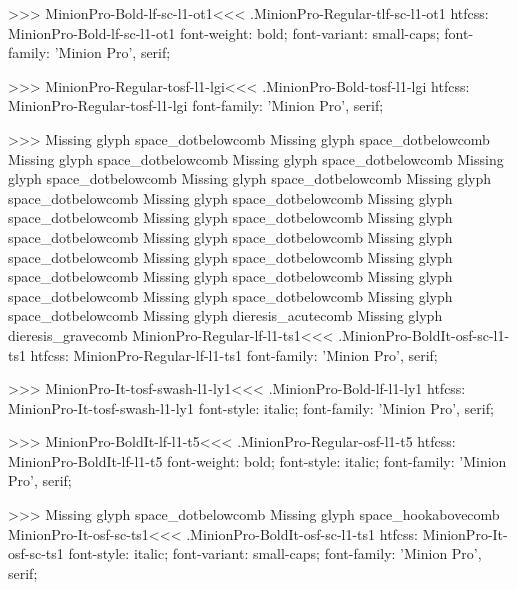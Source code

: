{{>>>
\<MinionPro-Bold-lf-sc-l1-ot1\><<<
.MinionPro-Regular-tlf-sc-l1-ot1
htfcss:  MinionPro-Bold-lf-sc-l1-ot1  font-weight: bold; font-variant: small-caps; font-family: 'Minion Pro', serif;

>>>
\<MinionPro-Regular-tosf-l1-lgi\><<<
.MinionPro-Bold-tosf-l1-lgi
htfcss:  MinionPro-Regular-tosf-l1-lgi  font-family: 'Minion Pro', serif;

>>>
Missing glyph	space_dotbelowcomb
Missing glyph	space_dotbelowcomb
Missing glyph	space_dotbelowcomb
Missing glyph	space_dotbelowcomb
Missing glyph	space_dotbelowcomb
Missing glyph	space_dotbelowcomb
Missing glyph	space_dotbelowcomb
Missing glyph	space_dotbelowcomb
Missing glyph	space_dotbelowcomb
Missing glyph	space_dotbelowcomb
Missing glyph	space_dotbelowcomb
Missing glyph	space_dotbelowcomb
Missing glyph	space_dotbelowcomb
Missing glyph	space_dotbelowcomb
Missing glyph	space_dotbelowcomb
Missing glyph	space_dotbelowcomb
Missing glyph	space_dotbelowcomb
Missing glyph	space_dotbelowcomb
Missing glyph	space_dotbelowcomb
Missing glyph	dieresis_acutecomb
Missing glyph	dieresis_gravecomb
\<MinionPro-Regular-lf-l1-ts1\><<<
.MinionPro-BoldIt-osf-sc-l1-ts1
htfcss:  MinionPro-Regular-lf-l1-ts1  font-family: 'Minion Pro', serif;

>>>
\<MinionPro-It-tosf-swash-l1-ly1\><<<
.MinionPro-Bold-lf-l1-ly1
htfcss:  MinionPro-It-tosf-swash-l1-ly1  font-style: italic; font-family: 'Minion Pro', serif;

>>>
\<MinionPro-BoldIt-lf-l1-t5\><<<
.MinionPro-Regular-osf-l1-t5
htfcss:  MinionPro-BoldIt-lf-l1-t5  font-weight: bold; font-style: italic; font-family: 'Minion Pro', serif;

>>>
Missing glyph	space_dotbelowcomb
Missing glyph	space_hookabovecomb
\<MinionPro-It-osf-sc-ts1\><<<
.MinionPro-BoldIt-osf-sc-l1-ts1
htfcss:  MinionPro-It-osf-sc-ts1  font-style: italic; font-variant: small-caps; font-family: 'Minion Pro', serif;

}}
